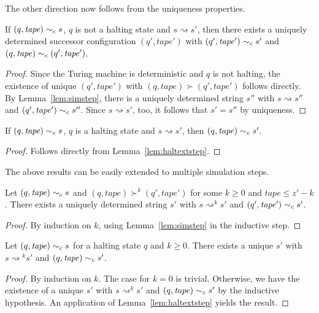 \documentclass[a4paper,UKenglish,cleveref, autoref]{lipics-v2019}
\newcommand{\strent}{\rightsquigarrow}
\begin{document}
The other direction now follows from the uniqueness properties. 

\begin{lemma}
  If $(q, \mathit{tape}) \sim_c{} s$, $q$ is not a halting state and $s \strent{} s'$, then there exists a uniquely determined successor configuration $(q', \mathit{tape}')$ with $(q', \mathit{tape}') \sim_c{} s'$ and $(q, \mathit{tape}) \sim_c (q', \mathit{tape}')$. 
\end{lemma}
\begin{proof}
  Since the Turing machine is deterministic and $q$ is not halting, the existence of unique $(q', \mathit{tape}')$ with $(q, \mathit{tape}) \succ (q', \mathit{tape}')$ follows directly. By Lemma~\ref{lem:simstep}, there is a uniquely determined string $s''$ with $s \strent{} s''$ and $(q', \mathit{tape}') \sim_c{} s''$. Since $s \strent{} s'$, too, it follows that $s' = s''$ by uniqueness.
\end{proof}

\begin{lemma}
  If $(q, \mathit{tape}) \sim_c{} s$, $q$ is a halting state and $s \strent{} s'$, then $(q, \mathit{tape}) \sim_c{} s'$. 
\end{lemma}
\begin{proof}
  Follows directly from Lemma~\ref{lem:haltextstep}. 
\end{proof}

The above results can be easily extended to multiple simulation steps. 
\begin{lemma}\label{lem:mssim}
  Let $(q, \mathit{tape}) \sim_c{} s$ and $(q, \mathit{tape}) \succ^k (q', \mathit{tape}')$ for some $k \ge 0$ and $\mathit{tape} \le z' - k$. There exists a uniquely determined string $s'$ with $s \strent^k s'$ and $(q', \mathit{tape}') \sim_c{} s'$. 
\end{lemma}
\begin{proof}
  By induction on $k$, using Lemma~\ref{lem:simstep} in the inductive step.
\end{proof}

\begin{lemma}\label{lem:haltext}
  Let $(q, \mathit{tape}) \sim_c{} s$ for a halting state $q$ and $k \ge 0$. There exists a unique $s'$ with $s \strent{}^k s'$ and $(q, \mathit{tape}) \sim_c{} s'$. 
\end{lemma}
\begin{proof}
  By induction on $k$. The case for $k = 0$ is trivial.
  Otherwise, we have the existence of a unique $s'$ with $s \strent^k s'$ and $(q, \mathit{tape}) \sim_c{} s'$ by the inductive hypothesis. An application of Lemma~\ref{lem:haltextstep} yields the result.
\end{proof}
\end{document}
